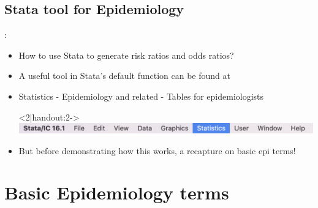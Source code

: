 \subsection{Stata tool for Epidemiology}
\begin{frame}{\secname: \subsecname}
\begin{itemize}
	\item How to use Stata to generate risk ratios and odds ratios?
	\item<2|handout:2-> A useful tool in Stata's default function can be found at 
	\item<2|handout:2-> Statistics - Epidemiology and related - Tables for epidemiologists
	\item[]<2|handout:2-> \includegraphics[scale=0.5]{image/bar}
	\item<3|handout:3> But before demonstrating how this works, a recapture on basic epi terms!
\end{itemize}

\end{frame}
\section{Basic Epidemiology terms}
